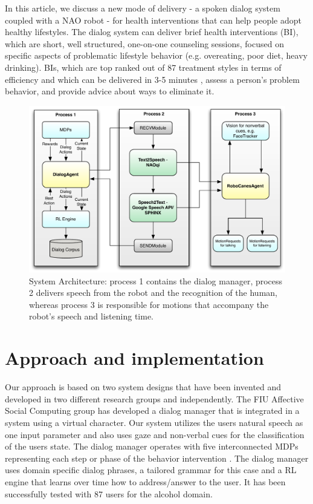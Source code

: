 \documentclass[letterpaper]{article}
\begin{document}
In this article, we discuss a new mode of delivery - a spoken dialog system coupled with a NAO robot - for health interventions that can help people adopt healthy lifestyles.  The dialog system can deliver brief health interventions (BI), which are short, well structured, one-on-one counseling sessions, focused on specific aspects of problematic lifestyle behavior (e.g. overeating, poor diet, heavy drinking). BIs, which are top ranked out of 87 treatment styles in terms of efficiency \cite{miller2002mesa} and which can be delivered in 3-5 minutes \cite{Moyer2002}, assess a person's problem behavior, and provide advice about ways to eliminate it. 

\begin{figure}[!t] 
\centering 
\includegraphics[width=.6\textwidth]{figures/system} 
\caption{System Architecture: process 1 contains the dialog manager, process 2 delivers speech from the robot and
the recognition of the human, whereas process 3 is responsible for motions that accompany the robot's
speech and listening time.} 
\label{fig:system} \end{figure}

\section*{Approach and implementation} Our approach is based on two system designs that have been
invented and developed in two different research groups and independently. The FIU Affective Social Computing group has developed a dialog manager that is integrated in a system using a virtual 
character.  Our system utilizes the users natural speech as one input parameter and also uses gaze
and non-verbal cues for the classification of the users state. The dialog manager operates with five
interconnected MDPs representing each step or phase of the behavior intervention 
\cite{YASCLL14}. The dialog manager uses domain specific dialog phrases, a tailored grammar for
this case and a RL engine that learns over time how to address/answer to the user. It has been
successfully tested with 87 users for the alcohol domain.
\end{document}

